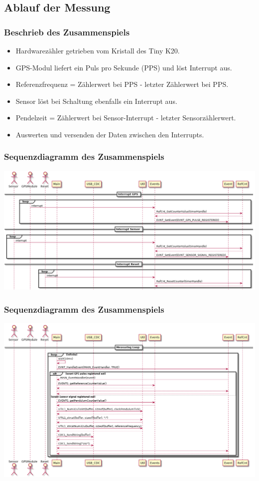 \subsection{Ablauf der Messung}
\begin{frame}
	\frametitle{Beschrieb des Zusammenspiels}
	\begin{itemize}
		\item Hardwarezähler getrieben vom Kristall des Tiny K20.
		\item GPS-Modul liefert ein Puls pro Sekunde (PPS) und löst Interrupt aus.
		\item Referenzfrequenz = Zählerwert bei PPS - letzter Zählerwert bei PPS.
		\item Sensor löst bei Schaltung ebenfalls ein Interrupt aus.
		\item Pendelzeit = Zählerwert bei Sensor-Interrupt - letzter Sensorzählerwert.
		\item Auswerten und versenden der Daten zwischen den Interrupts.
	\end{itemize}
\end{frame}

\begin{frame}
	\frametitle{Sequenzdiagramm des Zusammenspiels}
	\centering
	\includegraphics[width=\textwidth]{../docs/uml/sequence_hwb_1}
\end{frame}

\begin{frame}
	\frametitle{Sequenzdiagramm des Zusammenspiels}
	\centering
	\includegraphics[width=\textwidth]{../docs/uml/sequence_hwb_2}
\end{frame}